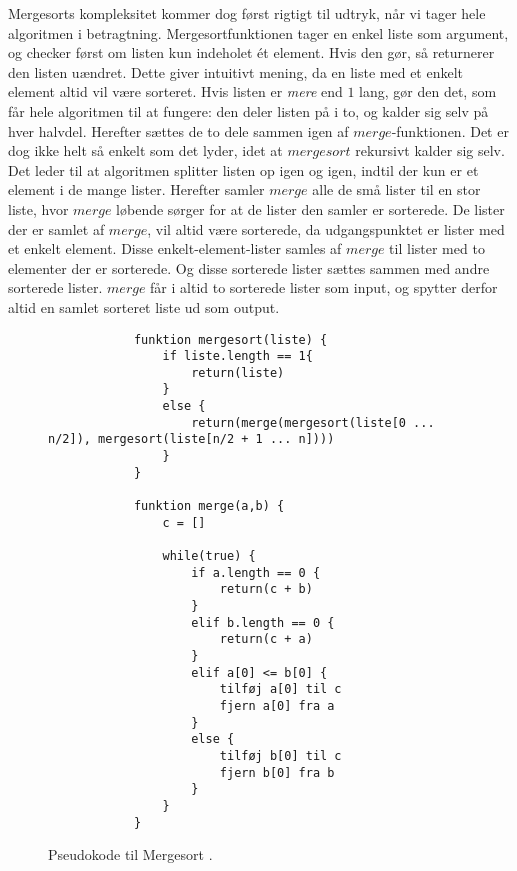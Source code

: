Mergesorts kompleksitet kommer dog først rigtigt til udtryk, når vi tager hele algoritmen i betragtning. Mergesortfunktionen tager en enkel liste som argument, og checker først om listen kun indeholet ét element. Hvis den gør, så returnerer den listen uændret. Dette giver intuitivt mening, da en liste med et enkelt element altid vil være sorteret. Hvis listen er \emph{mere} end $1$ lang, gør den det, som får hele algoritmen til at fungere: den deler listen på i to, og kalder sig selv på hver halvdel. Herefter sættes de to dele sammen igen af $merge$-funktionen. Det er dog ikke helt så enkelt som det lyder, idet at $mergesort$ rekursivt kalder sig selv. Det leder til at algoritmen splitter listen op igen og igen, indtil der kun er et element i de mange lister. Herefter samler $merge$ alle de små lister til en stor liste, hvor $merge$ løbende sørger for at de lister den samler er sorterede. De lister der er samlet af $merge$, vil altid være sorterede, da udgangspunktet er lister med et enkelt element. Disse enkelt-element-lister samles af $merge$ til lister med to elementer der er sorterede. Og disse sorterede lister sættes sammen med andre sorterede lister. $merge$ får i altid to sorterede lister som input, og spytter derfor altid en samlet sorteret liste ud som output.


\begin{figure}
	\begin{center}
		\begin{lstlisting}
			funktion mergesort(liste) {
				if liste.length == 1{
					return(liste)
				}
				else {
					return(merge(mergesort(liste[0 ... n/2]), mergesort(liste[n/2 + 1 ... n])))
				}
			}

			funktion merge(a,b) {
				c = []

				while(true) {
					if a.length == 0 {
						return(c + b)
					}
					elif b.length == 0 {
						return(c + a)
					}
					elif a[0] <= b[0] {
						tilføj a[0] til c
						fjern a[0] fra a
					}
					else {
						tilføj b[0] til c
						fjern b[0] fra b
					}
				}
			}

		\end{lstlisting}
	\end{center}
	\vspace{-5mm}
	\caption{Pseudokode til Mergesort \cite[s. 106]{aogd}.}
	\label{fig:Pseudokode til mergesort}
\end{figure}






